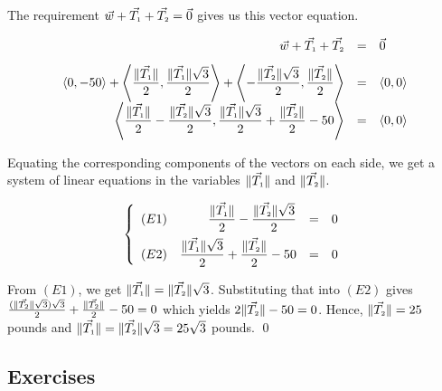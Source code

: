 \begin{ex}
The requirement $\vec{w} + \vec{T_{\text{\tiny $1$}}} + \vec{T_{\text{\tiny $2$}}} = \vec{0}$ gives us this vector equation.
 
 \[ \begin{array}{rcl}
 
\vec{w} + \vec{T_{\text{\tiny $1$}}} + \vec{T_{\text{\tiny $2$}}} &  = &  \vec{0}  \\ [8pt]

\left<0,-50\right> + \left< \dfrac{\| \vec{T_{\text{\tiny $1$}}} \|}{2} , \dfrac{\| \vec{T_{\text{\tiny $1$}}} \|\sqrt{3}}{2}\right> +  \left<-\dfrac{\| \vec{T_{\text{\tiny $2$}}} \|\sqrt{3}}{2}, \dfrac{\| \vec{T_{\text{\tiny $2$}}} \|}{2} \right> & = & \left<0, 0\right> \\ [8pt]

\left< \dfrac{\| \vec{T_{\text{\tiny $1$}}} \|}{2} -\dfrac{\| \vec{T_{\text{\tiny $2$}}} \|\sqrt{3}}{2}, \dfrac{\| \vec{T_{\text{\tiny $1$}}} \|\sqrt{3}}{2} +  \dfrac{\| \vec{T_{\text{\tiny $2$}}} \|}{2} -50  \right> & = & \left<0, 0\right>  \\ 
\end{array} \]

Equating the corresponding components of the vectors on each side,  we get a system of linear equations in the variables $\| \vec{T_{\text{\tiny $1$}}} \| $ and   $\| \vec{T_{\text{\tiny $2$}}} \|$.

\[\left\{ \begin{array}{lrcl} (E1) &  \dfrac{\| \vec{T_{\text{\tiny $1$}}} \|}{2} -\dfrac{\| \vec{T_{\text{\tiny $2$}}} \|\sqrt{3}}{2} & = & 0 \\ [8pt]  (E2) &  \dfrac{\| \vec{T_{\text{\tiny $1$}}} \|\sqrt{3}}{2} +  \dfrac{\| \vec{T_{\text{\tiny $2$}}} \|}{2} -50 & = & 0 \\ \end{array} \right.\]

From $(E1)$, we get $\| \vec{T_{\text{\tiny $1$}}} \| = \| \vec{T_{\text{\tiny $2$}}} \| \sqrt{3}$.  Substituting that into $(E2)$ gives $\frac{(\| \vec{T_{\text{\tiny $2$}}} \| \sqrt{3})\sqrt{3}}{2} +  \frac{\| \vec{T_{\text{\tiny $2$}}} \|}{2} - 50 = 0$ which yields $2\| \vec{T_{\text{\tiny $2$}}} \| - 50 =0$.  Hence, $\| \vec{T_{\text{\tiny $2$}}} \| = 25$ pounds and  $\| \vec{T_{\text{\tiny $1$}}} \| = \| \vec{T_{\text{\tiny $2$}}} \| \sqrt{3} = 25 \sqrt{3}$ pounds. \qed
\end{ex}

\newpage

\subsection{Exercises}

